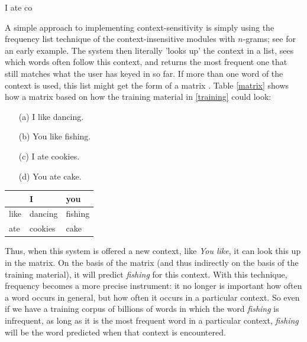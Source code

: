 \documentclass[11pt]{article}
\begin{document}
\begin{examples}
\item I ate co \label{iate}
\end{examples}

A simple approach to implementing context-sensitivity is simply using the frequency list technique of the context-insensitive modules with $n$-grams;  see  for an early example. The system then literally 'looks up' the context in a list, sees which words often follow this context, and returns the most frequent one that still matches what the user has keyed in so far. If more than one word of the context is used, this list might get the form of a matrix \cite{Garay-Vitoria+06}. Table \ref{matrix} shows how a matrix based on how the training material in \ref{training} could look:

\begin{examples}

\item 

\begin{itemize} \label{training}
\item[(a)] I like dancing.
\item[(b)] You like fishing.
\item[(c)] I ate cookies.
\item[(d)] You ate cake.
\end{itemize}

\item \begin{tabular}{l|ll}
&I&you\\
\hline
like&dancing&fishing\\
ate&cookies&cake\\
\end{tabular} \label{matrix}

\end{examples}

Thus, when this system is offered a new context, like \emph{You like}, it can look this up in the matrix. On the basis of the matrix (and thus indirectly on the basis of the training material), it will predict \emph{fishing} for this context. With this technique, frequency becomes a more precise instrument: it no longer is important how often a word occurs in general, but how often it occurs in a particular context. So even if we have a training corpus of billions of words in which the word \emph{fishing} is infrequent, as long as it is the most frequent word in a particular context, \emph{fishing} will be the word predicted when that context is encountered.
\end{document}
